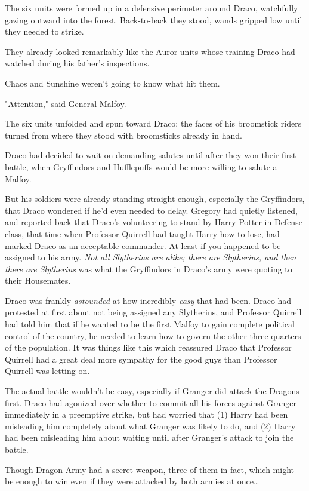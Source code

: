 The six units were formed up in a defensive perimeter around Draco, watchfully 
gazing outward into the forest. Back-to-back they stood, wands gripped low 
until they needed to strike.

They already looked remarkably like the Auror units whose training Draco had 
watched during his father's inspections.

Chaos and Sunshine weren't going to know what hit them.

"Attention," said General Malfoy.

The six units unfolded and spun toward Draco; the faces of his broomstick 
riders turned from where they stood with broomsticks already in hand.

Draco had decided to wait on demanding salutes until after they won their first 
battle, when Gryffindors and Hufflepuffs would be more willing to salute a 
Malfoy.

But his soldiers were already standing straight enough, especially the 
Gryffindors, that Draco wondered if he'd even needed to delay. Gregory had 
quietly listened, and reported back that Draco's volunteering to stand by Harry 
Potter in Defense class, that time when Professor Quirrell had taught Harry how 
to lose, had marked Draco as an acceptable commander. At least if you happened 
to be assigned to his army. \emph{Not all Slytherins are alike; there are 
Slytherins, and then there are Slytherins} was what the Gryffindors in Draco's 
army were quoting to their Housemates.

Draco was frankly \emph{astounded} at how incredibly \emph{easy} that had been. 
Draco had protested at first about not being assigned any Slytherins, and 
Professor Quirrell had told him that if he wanted to be the first Malfoy to 
gain complete political control of the country, he needed to learn how to 
govern the other three-quarters of the population. It was things like this 
which reassured Draco that Professor Quirrell had a great deal more sympathy 
for the good guys than Professor Quirrell was letting on.

The actual battle wouldn't be easy, especially if Granger did attack the 
Dragons first. Draco had agonized over whether to commit all his forces against 
Granger immediately in a preemptive strike, but had worried that (1) Harry had 
been misleading him completely about what Granger was likely to do, and (2) 
Harry had been misleading him about waiting until after Granger's attack to 
join the battle.

Though Dragon Army had a secret weapon, three of them in fact, which might be 
enough to win even if they were attacked by both armies at once{\ldots}

